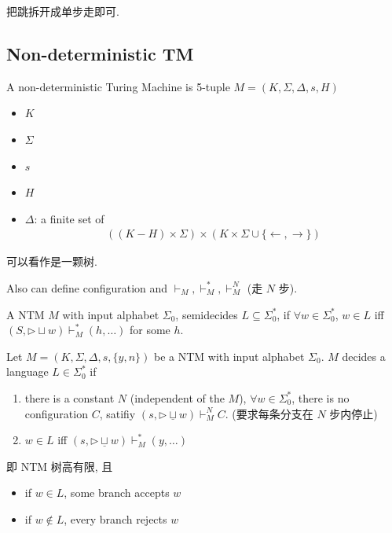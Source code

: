 把跳拆开成单步走即可. 

\subsection{Non-deterministic TM}
\begin{definition}
    A non-deterministic Turing Machine is 5-tuple $M=(K, \Sigma, \Delta, s, H)$
    \begin{itemize}
        \item $K$
        \item $\Sigma$
        \item $s$
        \item $H$
        \item $\Delta$: a finite set of 
        \begin{align*}
            ((K-H)\times \Sigma)\times (K\times \Sigma \cup \{ \leftarrow , \rightarrow \})
        \end{align*}
    \end{itemize}
\end{definition}
可以看作是一颗树. 

Also can define configuration and $\vdash_M, \vdash_M^*, \vdash_M^N$ (走 $N$ 步). 

\begin{definition}
    A NTM $M$ with input alphabet $\Sigma_0$, semidecides $L\subseteq \Sigma_0^*$, if $\forall w \in \Sigma_0^*$, $w\in L$ iff $(S, \triangleright \sqcup w)\vdash^*_M (h,\dots)$ for some $h$. 
\end{definition}

\begin{definition}
    Let $M=(K, \Sigma, \Delta, s, \{ y,n \})$ be a NTM with input alphabet $\Sigma_0$. $M$ decides a language $L\in \Sigma_0^*$ if 
    \begin{enumerate}
        \item there is a constant $N$ (independent of the $M$), $\forall w\in \Sigma_0^*$, there is no configuration $C$, satifiy $(s,\triangleright \underline{\sqcup} w)\vdash_M^N C$. (要求每条分支在 $N$ 步内停止)
        \item $w\in L$ iff $(s,\triangleright \underline{\sqcup} w)\vdash_M^*(y,\dots)$
    \end{enumerate}
\end{definition}
即 NTM 树高有限, 且
\begin{itemize}
    \item if $w\in L$, some branch accepts $w$
    \item if $w\notin L$, every branch rejects $w$
\end{itemize}

